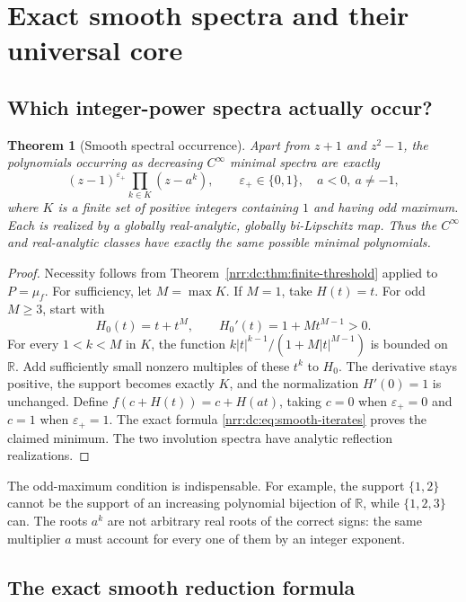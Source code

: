 \documentclass[11pt,letterpaper]{article}
\newtheorem{theorem}{Theorem}[section]
\theoremstyle{definition}
\theoremstyle{remark}
\newcommand{\R}{\mathbb R}
\begin{document}
\section{Exact smooth spectra and their universal core}
\label{nrr:dc:sec:smooth-core}

\subsection{Which integer-power spectra actually occur?}

\begin{theorem}[Smooth spectral occurrence]
\label{nrr:dc:thm:smooth-occurrence}
Apart from $z+1$ and $z^2-1$, the polynomials occurring as decreasing
$C^\infty$ minimal spectra are exactly
\begin{equation}
 (z-1)^{\varepsilon_+}\prod_{k\in K}(z-a^k),
 \qquad \varepsilon_+\in\{0,1\},\quad a<0,\ a\ne-1,
 \label{nrr:dc:eq:smooth-occurrence}
\end{equation}
where $K$ is a finite set of positive integers containing $1$ and
having odd maximum. Each is realized by a globally real-analytic,
globally bi-Lipschitz map. Thus the $C^\infty$ and real-analytic classes
have exactly the same possible minimal polynomials.
\end{theorem}
\begin{proof}
Necessity follows from Theorem~\ref{nrr:dc:thm:finite-threshold} applied to
$P=\mu_f$. For sufficiency, let $M=\max K$. If $M=1$, take $H(t)=t$.
For odd $M\ge3$, start with
\[
 H_0(t)=t+t^M,\qquad H_0'(t)=1+Mt^{M-1}>0.
\]
For every $1<k<M$ in $K$, the function
$k|t|^{k-1}/(1+M|t|^{M-1})$ is bounded on $\R$. Add sufficiently
small nonzero multiples of these $t^k$ to $H_0$. The derivative stays
positive, the support becomes exactly $K$, and the normalization
$H'(0)=1$ is unchanged. Define
$f(c+H(t))=c+H(at)$, taking $c=0$ when $\varepsilon_+=0$ and $c=1$ when
$\varepsilon_+=1$. The exact formula \eqref{nrr:dc:eq:smooth-iterates} proves
the claimed minimum. The two involution spectra have analytic reflection
realizations.
\end{proof}

The odd-maximum condition is indispensable. For example, the support
$\{1,2\}$ cannot be the support of an increasing polynomial bijection
of $\R$, while $\{1,2,3\}$ can. The roots $a^k$ are not arbitrary
real roots of the correct signs: the same multiplier $a$ must account
for every one of them by an integer exponent.

\subsection{The exact smooth reduction formula}
\end{document}
